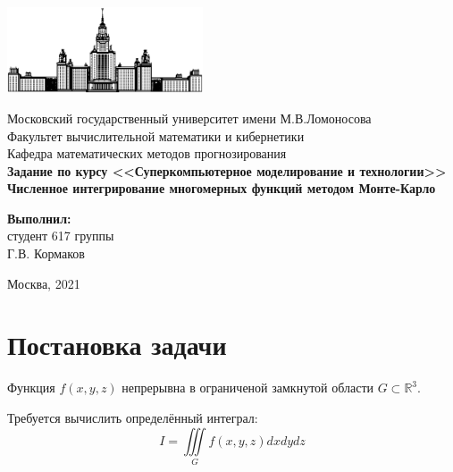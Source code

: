 \documentclass[12pt, fleqn]{article}
\theoremstyle{definition}
\begin{document}
\hypersetup{pageanchor=false}
\begin{titlepage}
\begin{center}
    \includegraphics[width=58mm]{msu.eps}
    
    Московский государственный университет имени М.В.Ломоносова\\
    Факультет вычислительной математики и кибернетики\\
    Кафедра математических методов прогнозирования\\[25mm]

    \textsf{
        \Large\bfseries 
        Задание по курсу <<Суперкомпьютерное моделирование и технологии>>
        \\[5mm] 
        Численное интегрирование многомерных функций методом Монте-Карло
    }\\[12mm]
    
    \begin{flushright}
        \parbox{0.5\textwidth}{
        \begin{flushright}
            \textbf{Выполнил:}\\
            студент 617 группы \\
            Г.В. Кормаков
        \end{flushright}
        }
    \end{flushright}

    \vspace{\fill}
    Москва, 2021
\end{center}

\end{titlepage}
\hypersetup{pageanchor=true}
\tableofcontents
\newpage
\section{Постановка задачи}
Функция $f(x, y, z)$ непрерывна в ограниченой замкнутой области $G \subset \mathbb{R}^{3}$.

Требуется вычислить определённый интеграл:
\abovedisplayskip=1pt
\belowdisplayskip=2pt
\noindent
$$
I=\iiint\limits_{G} f(x, y, z) d x d y d z
$$
\end{document}
